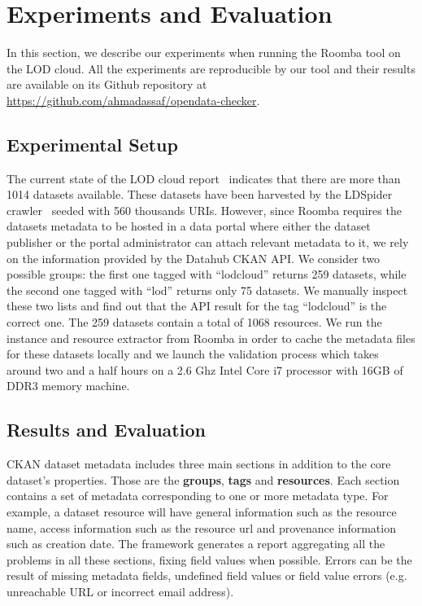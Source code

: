 \documentclass[runningheads,a4paper]{../../Util/LaTEX/llncs}
\begin{document}

\section{Experiments and Evaluation}
\label{sec:experiment}
In this section, we describe our experiments when running the Roomba tool on the LOD cloud. All the experiments are reproducible by our tool and their results are available on its Github repository at \url{https://github.com/ahmadassaf/opendata-checker}.

\subsection{Experimental Setup}
The current state of the LOD cloud report~\cite{Schmachtenberg:ISWC:14} indicates that there are more than 1014 datasets available. These datasets have been harvested by the LDSpider crawler~\cite{Isele:ISWC:10} seeded with 560 thousands URIs. However, since Roomba requires the datasets metadata to be hosted in a data portal where either the dataset publisher or the portal administrator can attach relevant metadata to it, we rely on the information provided by the Datahub CKAN API. We consider two possible groups: the first one tagged with ``lodcloud'' returns 259 datasets, while the second one tagged with ``lod'' returns only 75 datasets. We manually inspect these two lists and find out that the API result for the tag ``lodcloud'' is the correct one. The 259 datasets contain a total of 1068 resources. We run the instance and resource extractor from Roomba in order to cache the metadata files for these datasets locally and we launch the validation process which takes around two and a half hours on a 2.6 Ghz Intel Core i7 processor with 16GB of DDR3 memory machine.

\subsection{Results and Evaluation}
CKAN dataset metadata includes three main sections in addition to the core dataset's properties. Those are the \textbf{groups}, \textbf{tags} and \textbf{resources}. Each section contains a set of metadata corresponding to one or more metadata type. For example, a dataset resource will have general information such as the resource name, access information such as the resource url and provenance information such as creation date. The framework generates a report aggregating all the problems in all these sections, fixing field values when possible. Errors can be the result of missing metadata fields, undefined field values or field value errors (e.g. unreachable URL or incorrect email address).
\end{document}

